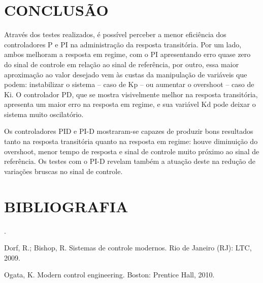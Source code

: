 \documentclass[a4paper,12pt]{article}
\begin{document}
\newpage


\thispagestyle{main}

\section{CONCLUSÃO}


\hspace{4ex}Através dos testes realizados, é possível perceber a menor eficiência dos controladores P e PI na administração da resposta transitória. Por um lado, ambos melhoram a resposta em regime, com o PI apresentando erro quase zero do sinal de controle em relação ao sinal de referência, por outro, essa maior aproximação ao valor desejado vem às custas da manipulação de variáveis que podem: instabilizar o sistema – caso de Kp – ou aumentar o overshoot – caso de Ki. O controlador PD, que se mostra visivelmente melhor na resposta transitória, apresenta um maior erro na resposta em regime, e sua variável Kd pode deixar o sistema muito oscilatório.

Os controladores PID e PI-D mostraram-se capazes de produzir bons resultados tanto na resposta transitória quanto na resposta em regime: houve diminuição do overshoot, menor tempo de resposta e sinal de controle muito próximo ao sinal de referência. Os testes com o PI-D revelam também a atuação deste na redução de variações bruscas no sinal de controle. 

\newpage


\thispagestyle{empty}
\section{BIBLIOGRAFIA}
 .
 
Dorf, R.; Bishop, R. Sistemas de controle modernos. Rio de Janeiro (RJ): LTC, 2009. 

Ogata, K. Modern control engineering. Boston: Prentice Hall, 2010.


%

%
\end{document}
